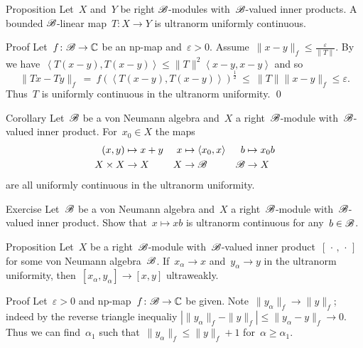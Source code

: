 \documentclass[b]{subfiles}
\begin{document}
\begin{parsec}%
\begin{point}{Proposition}%
Let~$X$ and~$Y$ be right $\mathscr{B}$-modules
    with~$\mathscr{B}$-valued inner products.
A bounded $\mathscr{B}$-linear map~$T\colon X \to Y$
    is ultranorm uniformly continuous.
\begin{point}{Proof}%
Let~$f\colon \mathscr{B} \to \mathbb{C}$ be an np-map
    and~$\varepsilon > 0$.
Assume~$\|x-y\|_f \leq \frac{\varepsilon}{\|T\|}$.
By 
we have~$\left<T(x-y), T(x-y)\right> \leq \|T\|^2\left<x-y,x-y\right>$
and so
\begin{equation*}
    \|Tx - Ty\|_f \  =\  f(\left<T(x-y),T(x-y)\right>)^{\frac{1}{2}}
\ \leq\  \|T\| \|x-y\|_f \leq \varepsilon.
\end{equation*}
Thus~$T$ is uniformly continuous in the ultranorm uniformity. \qed
\end{point}
\end{point}
\begin{point}[ultranormcontstruct]{Corollary}%
Let~$\mathscr{B}$ be a von Neumann algebra
    and~$X$ a right~$\mathscr{B}$-module
    with~$\mathscr{B}$-valued inner product.
For~$x_0 \in X$ the maps
\begin{align*}
    (x,y) &\mapsto x+y & x &\mapsto \left<x_0, x\right>
    & b &\mapsto x_0 b \\
    X\times X &\to X & X &\to \mathscr{B} & \mathscr{B} & \to X
\end{align*}
are all uniformly continuous in the ultranorm uniformity.
\end{point}
\begin{point}[ultranormscalar]{Exercise}%
Let~$\mathscr{B}$ be a von Neumann algebra and~$X$ a right~$\mathscr{B}$-module
    with~$\mathscr{B}$-valued inner product.
Show that~$x \mapsto xb$
    is ultranorm continuous for any~$b \in \mathscr{B}$.
\end{point}
\begin{point}{Proposition}%
Let~$X$ be a right~$\mathscr{B}$-module
    with~$\mathscr{B}$-valued inner product~$[\,\cdot\,,\,\cdot\,]$
    for some von Neumann algebra~$\mathscr{B}$.
If~$x_\alpha \to x$ and~$y_\alpha \to y$
    in the ultranorm uniformity,
    then~$[x_\alpha,y_\alpha] \to [x,y]$ ultraweakly.
\begin{point}{Proof}%
Let~$\varepsilon > 0$ and np-map~$f\colon \mathscr{B} \to \mathbb{C}$ be given.
Note~$\|y_\alpha\|_f \to \|y\|_f$;
    indeed by the reverse triangle inequaliy 
    $|\|y_\alpha\|_f - \|y\|_f| \leq \| y_\alpha - y\|_f \to 0$.
Thus we can find~$\alpha_1$ such that~$\|y_\alpha\|_f \leq \|y\|_f + 1$
    for~$\alpha \geq \alpha_1$.


\end{point}
\end{point}
\end{parsec}
\end{document}
